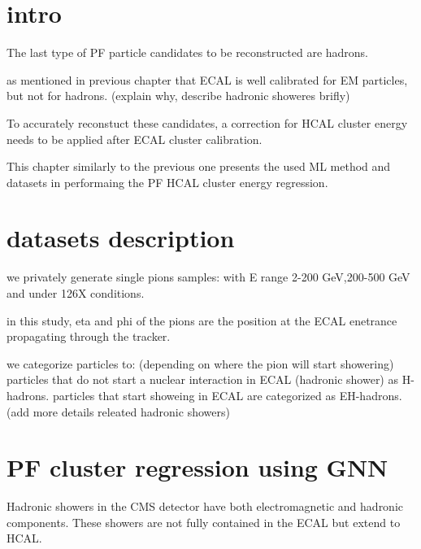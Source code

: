 \section{intro}


The last type of PF particle candidates to be reconstructed are hadrons.


as mentioned in previous chapter that ECAL is well calibrated for EM particles, but not for hadrons. (explain why, describe hadronic showeres brifly)

To accurately reconstuct these candidates, a correction for HCAL cluster energy needs to be applied after ECAL cluster calibration.

This chapter similarly to the previous one presents the used ML method and datasets in performaing the PF HCAL cluster energy regression.


\section{datasets description}

we privately generate single pions samples: with  E range 2-200 GeV,200-500 GeV and under 126X conditions.

in this study, eta and phi of the pions are the position at the ECAL enetrance propagating through the tracker.  

we categorize particles to: (depending on where the pion will start showering)  
particles that do not start a nuclear interaction in ECAL (hadronic shower) as H-hadrons.
particles that start showeing in ECAL are categorized as EH-hadrons.  
(add more details releated hadronic showers)

\section{PF cluster regression  using GNN}

Hadronic showers in the CMS detector have both electromagnetic and hadronic components.
These showers are not fully contained in the ECAL but extend to HCAL.

